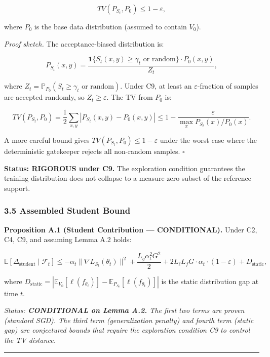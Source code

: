 \documentclass[
  12pt,
]{ctexart}
\begin{document}
\[TV(P_{S_t}, P_0) \leq 1 - \varepsilon,\]

where \(P_0\) is the base data distribution (assumed to contain
\(V_0\)).

\emph{Proof sketch.} The acceptance-biased distribution is:

\[P_{S_t}(x,y) = \frac{\mathbf{1}\{S_t(x,y) \geq \gamma_t \text{ or random}\} \cdot P_0(x,y)}{Z_t},\]

where \(Z_t = \mathbb{P}_{P_0}(S_t \geq \gamma_t \text{ or random})\).
Under C9, at least an \(\varepsilon\)-fraction of samples are accepted
randomly, so \(Z_t \geq \varepsilon\). The TV from \(P_0\) is:

\[TV(P_{S_t}, P_0) = \frac{1}{2} \sum_{x,y} |P_{S_t}(x,y) - P_0(x,y)| \leq 1 - \frac{\varepsilon}{\max_x P_{S_t}(x)/P_0(x)}.\]

A more careful bound gives \(TV(P_{S_t}, P_0) \leq 1 - \varepsilon\)
under the worst case where the deterministic gatekeeper rejects all
non-random samples. \(\square\)

\textbf{Status: RIGOROUS under C9.} The exploration condition guarantees
the training distribution does not collapse to a measure-zero subset of
the reference support.

\subsubsection{3.5 Assembled Student
Bound}\label{assembled-student-bound}

\textbf{Proposition A.1 (Student Contribution --- CONDITIONAL).} Under
C2, C4, C9, and assuming Lemma A.2 holds:

\[\mathbb{E}[\Delta_{\text{student}} \mid \mathcal{F}_t] \leq -\alpha_t \|\nabla L_{S_t}(\theta_t)\|^2 + \frac{L_g \alpha_t^2 G^2}{2} + 2 L_\ell L_f G \cdot \alpha_t \cdot (1 - \varepsilon) + D_{\text{static}},\]

where
\(D_{\text{static}} = |\mathbb{E}_{V_0}[\ell(f_{\theta_t})] - \mathbb{E}_{P_{S_t}}[\ell(f_{\theta_t})]|\)
is the static distribution gap at time \(t\).

\emph{Status: \textbf{CONDITIONAL on Lemma A.2.} The first two terms are
proven (standard SGD). The third term (generalization penalty) and
fourth term (static gap) are conjectured bounds that require the
exploration condition C9 to control the TV distance.}

\begin{center}\rule{0.5\linewidth}{0.5pt}\end{center}
\end{document}
